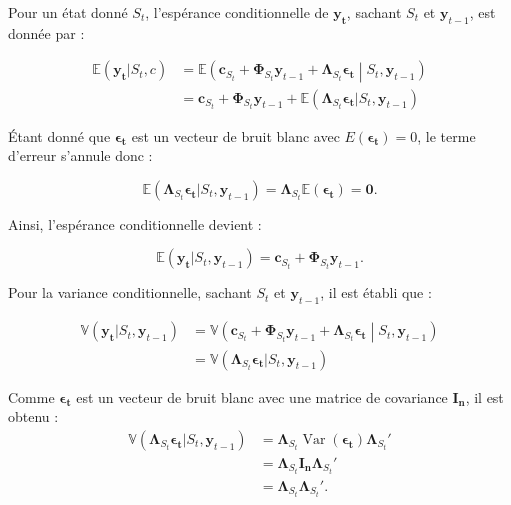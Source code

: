 \begin{sloppypar}
Pour un état donné $S_t$, l'espérance conditionnelle de $\bm{y_t}$, sachant $S_t$ et $\bm{y}_{t-1}$, est donnée par :

\begin{equation}
    \begin{split}
          \mathbb{E}(\bm{y_t} | S_t, c) &=  \mathbb{E}\left( \bm{c}_{S_t} + \bm{\Phi}_{S_t} \bm{y}_{t-1} + \bm{\Lambda}_{S_t} \bm{\epsilon_t} \middle| S_t, \bm{y}_{t-1} \right) \\
    &= \bm{c}_{S_t} + \bm{\Phi}_{S_t} \bm{y}_{t-1} +  \mathbb{E}(\bm{\Lambda}_{S_t} \bm{\epsilon_t} | S_t, \bm{y}_{t-1})  
    \end{split}
\end{equation}

Étant donné que $\bm{\epsilon_t}$ est un vecteur de bruit blanc avec $E(\bm{\epsilon_t}) = 0$, le terme d'erreur s'annule donc :

\begin{equation}
    \mathbb{E}(\bm{\Lambda}_{S_t} \bm{\epsilon_t} | S_t, \bm{y}_{t-1}) = \bm{\Lambda}_{S_t}  \mathbb{E}(\bm{\epsilon_t}) = \bm{0}.
\end{equation}

Ainsi, l'espérance conditionnelle devient :

\begin{equation}
    \mathbb{E}(\bm{y_t} | S_t, \bm{y}_{t-1}) = \bm{c}_{S_t} + \bm{\Phi}_{S_t} \bm{y}_{t-1}.
\end{equation}

Pour la variance conditionnelle, sachant $S_t$ et $\bm{y}_{t-1}$, il est établi que :

\begin{equation}
\begin{split}
  \mathbb{V}(\bm{y_t} | S_t, \bm{y}_{t-1}) &= \mathbb{V}\left( \bm{c}_{S_t} + \bm{\Phi}_{S_t} \bm{y}_{t-1} + \bm{\Lambda}_{S_t} \bm{\epsilon_t} \middle| S_t, \bm{y}_{t-1} \right) \\
    &= \mathbb{V}(\bm{\Lambda}_{S_t} \bm{\epsilon_t} | S_t, \bm{y}_{t-1})  
\end{split}
\end{equation}


Comme $\bm{\epsilon_t}$ est un vecteur de bruit blanc avec une matrice de covariance $\bm{I_n}$, il est obtenu :
\begin{equation}
    \begin{split}
         \mathbb{V}(\bm{\Lambda}_{S_t} \bm{\epsilon_t} | S_t, \bm{y}_{t-1}) &= \bm{\Lambda}_{S_t} \operatorname{Var}(\bm{\epsilon_t}) \bm{\Lambda}_{S_t}' \\
    &= \bm{\Lambda}_{S_t} \bm{I_n} \bm{\Lambda}_{S_t}' \\
    &= \bm{\Lambda}_{S_t} \bm{\Lambda}_{S_t}'.   
    \end{split}
\end{equation}


\end{sloppypar}
